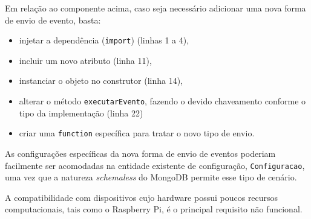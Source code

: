 Em relação ao componente acima, caso seja necessário adicionar uma nova forma de envio de evento, basta:

\begin{itemize}
	 \item injetar a dependência (\verb|import|) (linhas 1 a 4),
	 \item incluir um novo atributo (linha 11), 
	 \item instanciar o objeto no construtor (linha 14),
	 \item alterar o método \verb|executarEvento|, fazendo o devido chaveamento conforme o tipo da implementação (linha 22)
	 \item criar uma \verb|function| específica para tratar o novo tipo de envio.
\end{itemize}

As configurações específicas da nova forma de envio de eventos poderiam facilmente ser acomodadas na entidade existente de configuração, \verb|Configuracao|, uma vez que a natureza \textit{schemaless} do MongoDB permite esse tipo de cenário.

A compatibilidade com dispositivos cujo hardware possui poucos recursos computacionais, tais como o Raspberry Pi, é o principal requisito não funcional.